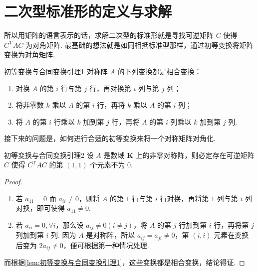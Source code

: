 

\section{二次型标准形的定义与求解}

所以用矩阵的语言表示的话，求解二次型的标准形就是寻找可逆矩阵 $C$ 使得 $C^\mathrm{T}AC$ 为对角矩阵. 最基础的想法就是如同相抵标准型那样，通过初等变换将矩阵变换为对角矩阵.

\begin{lemma}{}{初等变换与合同变换引理1}
    对称阵 $A$ 的下列变换都是相合变换：
    \begin{enumerate}
        \item 对换 $A$ 的第 $i$ 行与第 $j$ 行，再对换第 $i$ 列与第 $j$ 列；

        \item 将非零数 $k$ 乘以 $A$ 的第 $i$ 行，再将 $k$ 乘以 $A$ 的第 $i$ 列；

        \item 将 $A$ 的第 $i$ 行乘以 $k$ 加到第 $j$ 行，再将 $A$ 的第 $i$ 列乘以 $k$ 加到第 $j$ 列.
    \end{enumerate}
\end{lemma}

接下来的问题是，如何进行合适的初等变换来将一个对称矩阵对角化.

\begin{lemma}{}{初等变换与合同变换引理2}
    设 $A$ 是数域 $\mathbf{K}$ 上的非零对称阵，则必定存在可逆矩阵 $C$ 使得 $C^\mathrm{T}AC$ 的第 $(1, 1)$ 个元素不为 $0$.
\end{lemma}

\begin{proof}
    \begin{enumerate}
        \item 若 $a_{11} = 0$ 而 $a_{ii} \neq 0$，则将 $A$ 的第 $1$ 行与第 $i$ 行对换，再将第 $1$ 列与第 $i$ 列对换，即可使得 $a_{11} \neq 0$.
        \item 若 $a_{ii} = 0, \forall i$，那么设 $a_{ij} \neq 0(i \neq j)$，将 $A$ 的第 $j$ 行加到第 $i$ 行，再将第 $j$ 列加到第 $i$ 列. 因为 $A$ 是对称阵，所以 $a_{ij} = a_{ji} \neq 0$，第 $(i, i)$ 元素在变换后变为 $2 a_{ij} \neq 0$，便可根据第一种情况处理.
    \end{enumerate}
    而根据\autoref{lem:初等变换与合同变换引理1}，这些变换都是相合变换，结论得证.
\end{proof}

